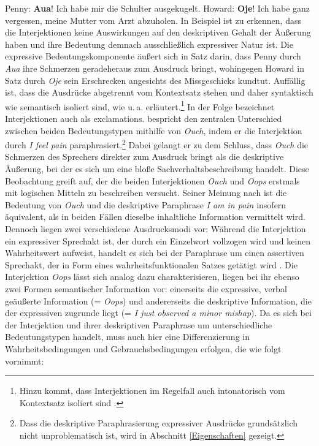 \ea  \label{Interjektionen}
\ea Penny: \glqq{}\textbf{Aua}! Ich habe mir die Schulter ausgekugelt.\grqq{} \label{penn0}
\ex Howard: \glqq{}\textbf{Oje}! Ich habe ganz vergessen, meine Mutter vom Arzt abzuholen.\grqq{} \label{howard1}
 \z
 \z
In Beispiel  ist zu erkennen, dass die Interjektionen keine Auswirkungen auf den deskriptiven Gehalt der Äußerung haben und ihre Bedeutung demnach ausschließlich expressiver Natur ist. Die expressive Bedeutungskomponente äußert sich in Satz  darin, dass Penny durch \textit{Aua} ihre Schmerzen geradeheraus zum Ausdruck bringt, wohingegen Howard in Satz  durch \textit{Oje} sein Erschrecken angesichts des Missgeschicks kundtut. Auffällig ist, dass die Ausdrücke abgetrennt vom Kontextsatz stehen und daher syntaktisch wie semantisch isoliert sind, wie u.\,a. {\citet[29]{Gutzmann.2015a}} erläutert.\footnote{Hinzu kommt, dass Interjektionen im Regelfall auch intonatorisch vom Kontextsatz isoliert sind \citep[vgl.][26]{Pittner.2015}.} In der Folge bezeichnet {\citet[249]{McCready.2012}} Interjektionen auch als  exclamations\grqq{}. \citet[151]{Hayner.1956} bespricht den zentralen Unterschied zwischen beiden Bedeutungstypen mithilfe von \textit{Ouch}, indem er die Interjektion durch \textit{I feel pain} paraphrasiert.\footnote{Dass die deskriptive Paraphrasierung expressiver Ausdrücke grundsätzlich nicht unproblematisch ist, wird in Abschnitt \ref{Eigenschaften} gezeigt.}  Dabei gelangt er zu dem Schluss, dass \textit{Ouch} die Schmerzen des Sprechers direkter zum Ausdruck bringt als die deskriptive Äußerung, bei der es sich um eine bloße Sachverhaltsbeschreibung handelt. Diese Beobachtung greift \citet[]{Kaplan.1997} auf, der die beiden Interjektionen \textit{Ouch} und \textit{Oops} erstmals mit logischen Mitteln zu beschreiben versucht. Seiner Meinung nach ist die Bedeutung von \textit{Ouch} und die deskriptive Paraphrase \textit{I am in pain} insofern äquivalent, als in beiden Fällen dieselbe inhaltliche Information vermittelt wird. Dennoch liegen zwei verschiedene Ausdrucksmodi vor: Während die Interjektion ein expressiver Sprechakt ist, der durch ein Einzelwort vollzogen wird und keinen Wahrheitswert aufweist, handelt es sich bei der Paraphrase um einen assertiven Sprechakt, der in Form eines wahrheitsfunktionalen Satzes getätigt wird {\citep[vgl.][11]{Kaplan.1997}}. Die Interjektion \textit{Oops} lässt sich analog dazu charakterisieren, liegen bei ihr ebenso zwei Formen semantischer Information vor: einerseits die expressive, verbal geäußerte Information (= \textit{Oops}) und andererseits die deskriptive Information, die der expressiven zugrunde liegt (= \textit{I just observed a minor mishap}). Da es sich bei der Interjektion und ihrer deskriptiven Paraphrase um unterschiedliche Bedeutungstypen handelt, muss auch hier eine Differenzierung in Wahrheitsbedingungen  und Gebrauchsbedingungen  erfolgen, die \citet[3]{Gutzmann.2019a} wie folgt vornimmt:

